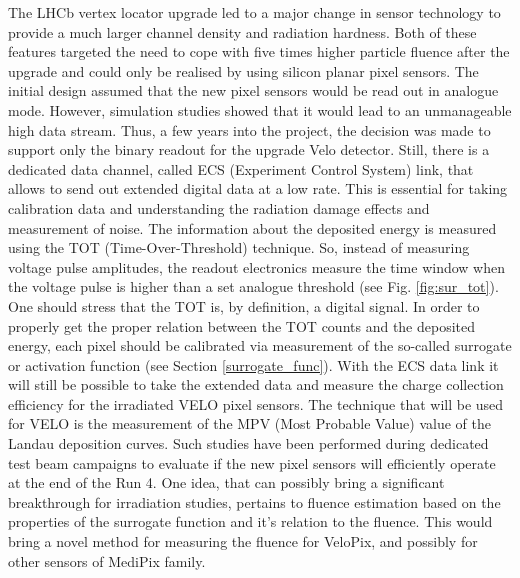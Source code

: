 The LHCb vertex locator upgrade led to a major change in sensor technology to provide a much larger channel density and radiation hardness. Both of these features targeted the need to cope with five times higher particle fluence after the upgrade and could only be realised by using silicon planar pixel sensors. The initial design assumed that the new pixel sensors would be read out in analogue mode. However, simulation studies showed that it would lead to an unmanageable high data stream. Thus, a few years into the project, the decision was made to support only the binary readout for the upgrade Velo detector. Still, there is a dedicated data channel, called ECS (Experiment Control System) link, that allows to send out extended digital data at a low rate. This is essential for taking calibration data and understanding the radiation damage effects and measurement of noise. The information about the deposited energy is measured using the TOT\cite{Esposito:2011} (Time-Over-Threshold) technique. So, instead of measuring voltage pulse amplitudes, the readout electronics measure the time window when the voltage pulse is higher than a set analogue threshold (see Fig. \ref{fig:sur_tot}). One should stress that the TOT is, by definition, a digital signal. In order to properly get the proper relation between the TOT counts and the deposited energy, each pixel should be calibrated via measurement of the so-called surrogate or activation function (see Section \ref{surrogate_func}).
With the ECS data link it will still be possible to take the extended data and measure the charge collection efficiency for the irradiated VELO pixel sensors. The technique that will be used for VELO is the measurement of the MPV (Most Probable Value) value of the Landau deposition curves. Such studies have been performed during dedicated test beam campaigns to evaluate if the new pixel sensors will efficiently operate at the end of the Run 4. One idea, that can possibly bring a significant breakthrough for irradiation studies, pertains to fluence estimation based on the properties of the surrogate function and it's relation to the fluence.
This would bring a novel method for measuring the fluence for VeloPix, and possibly for other sensors of MediPix family.

